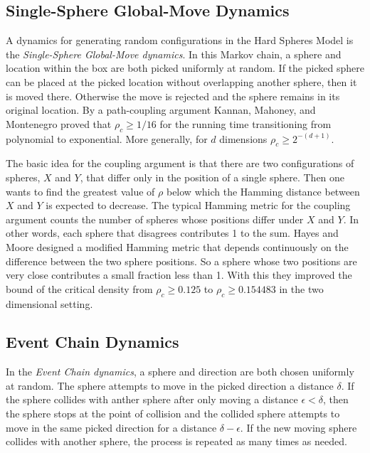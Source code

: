 \documentclass[a4paper,11pt]{article}
\begin{document}
\subsection*{Single-Sphere Global-Move Dynamics}

A dynamics for generating random configurations in the Hard Spheres Model is the \textit{Single-Sphere Global-Move dynamics}.  In this Markov chain, a sphere and location within the box are both picked uniformly at random.  If the picked sphere can be placed at the picked location without overlapping another sphere, then it is moved there.  Otherwise the move is rejected and the sphere remains in its original location.  By a path-coupling argument Kannan, Mahoney, and Montenegro \cite{Kannan} proved that $\rho_c \ge 1/16$ for the running time transitioning from polynomial to exponential.  More generally, for $d$ dimensions $\rho_c \ge 2^{-(d + 1)}$.

The basic idea for the coupling argument is that there are two configurations of spheres, $X$ and $Y$, that differ only in the position of a single sphere.  Then one wants to find the greatest value of $\rho$ below which the Hamming distance between $X$ and $Y$ is expected to decrease.  The typical Hamming metric for the coupling argument counts the number of spheres whose positions differ under $X$ and $Y$.  In other words, each sphere that disagrees contributes 1 to the sum.  Hayes and Moore \cite{Hayes} designed a modified Hamming metric that depends continuously on the difference between the two sphere positions.  So a sphere whose two positions are very close contributes a small fraction less than 1.  With this they improved the bound of the critical density from $\rho_c \ge 0.125$ to $\rho_c \ge 0.154483$ in the two dimensional setting.

\subsection*{Event Chain Dynamics}

In the \textit{Event Chain dynamics}, a sphere and direction are both chosen uniformly at random.  The sphere attempts to move in the picked direction a distance $\delta$.  If the sphere collides with anther sphere after only moving a distance $\epsilon < \delta$, then the sphere stops at the point of collision and the collided sphere attempts to move in the same picked direction for a distance $\delta - \epsilon$.  If the new moving sphere collides with another sphere, the process is repeated as many times as needed.
\end{document}
